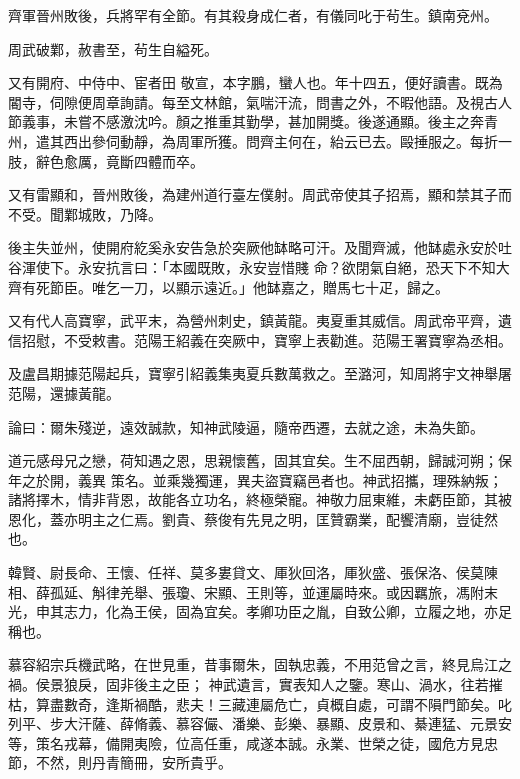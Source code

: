\begin{pinyinscope}
 齊軍晉州敗後，兵將罕有全節。有其殺身成仁者，有儀同叱于茍生。鎮南兗州。



 周武破鄴，赦書至，茍生自縊死。



 又有開府、中侍中、宦者田
 敬宣，本字鵬，蠻人也。年十四五，便好讀書。既為閽寺，伺隙便周章詢請。每至文林館，氣喘汗流，問書之外，不暇他語。及視古人節義事，未嘗不感激沈吟。顏之推重其勤學，甚加開獎。後遂通顯。後主之奔青州，遣其西出參伺動靜，為周軍所獲。問齊主何在，紿云已去。毆捶服之。每折一肢，辭色愈厲，竟斷四體而卒。



 又有雷顯和，晉州敗後，為建州道行臺左僕射。周武帝使其子招焉，顯和禁其子而不受。聞鄴城敗，乃降。



 後主失並州，使開府紇奚永安告急於突厥他缽略可汗。及聞齊滅，他缽處永安於吐谷渾使下。永安抗言曰：「本國既敗，永安豈惜賤
 命？欲閉氣自絕，恐天下不知大齊有死節臣。唯乞一刀，以顯示遠近。」他缽嘉之，贈馬七十疋，歸之。



 又有代人高寶寧，武平末，為營州刺史，鎮黃龍。夷夏重其威信。周武帝平齊，遺信招慰，不受敕書。范陽王紹義在突厥中，寶寧上表勸進。范陽王署寶寧為丞相。



 及盧昌期據范陽起兵，寶寧引紹義集夷夏兵數萬救之。至潞河，知周將宇文神舉屠范陽，還據黃龍。



 論曰：爾朱殘逆，遠效誠款，知神武陵逼，隨帝西遷，去就之途，未為失節。



 道元感母兄之戀，荷知遇之恩，思親懷舊，固其宜矣。生不屈西朝，歸誠河朔；保年之於開，義異
 策名。並乘幾獨運，異夫盜寶竊邑者也。神武招攜，理殊納叛；諸將擇木，情非背恩，故能各立功名，終極榮寵。神敬力屈東維，未虧臣節，其被恩化，蓋亦明主之仁焉。劉貴、蔡俊有先見之明，匡贊霸業，配饗清廟，豈徒然也。



 韓賢、尉長命、王懷、任祥、莫多婁貸文、厙狄回洛，厙狄盛、張保洛、侯莫陳相、薛孤延、斛律羌舉、張瓊、宋顯、王則等，並運屬時來。或因羈旅，馮附末光，申其志力，化為王侯，固為宜矣。孝卿功臣之胤，自致公卿，立履之地，亦足稱也。



 慕容紹宗兵機武略，在世見重，昔事爾朱，固執忠義，不用范曾之言，終見烏江之禍。侯景狼戾，固非後主之臣；
 神武遺言，實表知人之鑒。寒山、渦水，往若摧枯，算盡數奇，逢斯禍酷，悲夫！三藏連屬危亡，貞概自處，可謂不隕門節矣。叱列平、步大汗薩、薛脩義、慕容儼、潘樂、彭樂、暴顯、皮景和、綦連猛、元景安等，策名戎幕，備開夷險，位高任重，咸遂本誠。永業、世榮之徒，國危方見忠節，不然，則丹青簡冊，安所貴乎。



\end{pinyinscope}